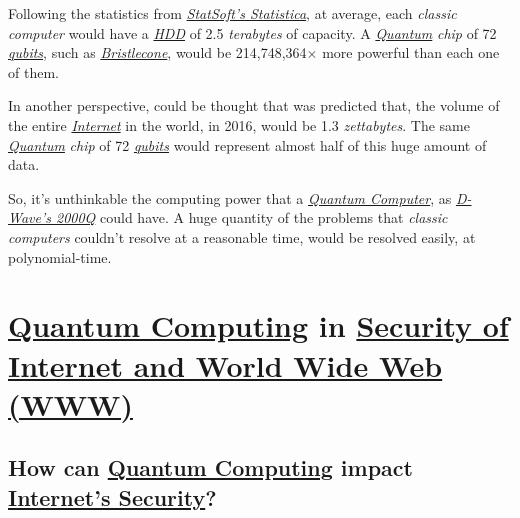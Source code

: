 \documentclass[conference]{IEEEtran}
\begin{document}
\vspace{4pt}

Following the statistics from \href{http://www.statsoft.com/Products/STATISTICA-Features}{\textit{StatSoft's Statistica}}, at average, each \textit{classic computer} would have a \href{https://en.wikipedia.org/wiki/Hard_disk_drive}{\textit{HDD}} of 2.5 \textit{terabytes} of capacity. A \href{https://en.wikipedia.org/wiki/Quantum}{\textit{Quantum}} \textit{chip} of 72 \href{https://en.wikipedia.org/wiki/Qubit}{\textit{qubits}}, such as \href{https://ai.googleblog.com/2018/03/a-preview-of-bristlecone-googles-new.html}{\textit{Bristlecone}}, would be 214,748,364$\times$ more powerful than each one of them.

\newpage

In another perspective, could be thought that was predicted that, the volume of the entire \href{https://en.wikipedia.org/wiki/Internet}{\textit{Internet}} in the world, in 2016, would be 1.3 \textit{zettabytes}. The same \href{https://en.wikipedia.org/wiki/Quantum}{\textit{Quantum}} \textit{chip} of 72 \href{https://en.wikipedia.org/wiki/Qubit}{\textit{qubits}} would represent almost half of this huge amount of data.

\vspace{4pt}

So, it's unthinkable the computing power that a \href{https://en.wikipedia.org/wiki/Quantum_computing}{\textit{Quantum Computer}}, as \href{https://en.wikipedia.org/wiki/D-Wave_Systems#D-Wave_2X_and_D-Wave_2000Q}{\textit{D-Wave's 2000Q}} could have. A huge quantity of the problems that \textit{classic computers} couldn't resolve at a reasonable time, would be resolved easily, at polynomial-time.

\vspace{6pt}

\section{\href{https://en.wikipedia.org/wiki/Quantum_computing}{Quantum Computing} in \href{https://en.wikipedia.org/wiki/Internet_security}{Security of Internet and World Wide Web (WWW)}}

\vspace{4pt}

\subsection{How can \href{https://en.wikipedia.org/wiki/Quantum_computing}{Quantum Computing} impact \href{https://en.wikipedia.org/wiki/Internet_security}{Internet's Security}?}\label{AA}
\end{document}
